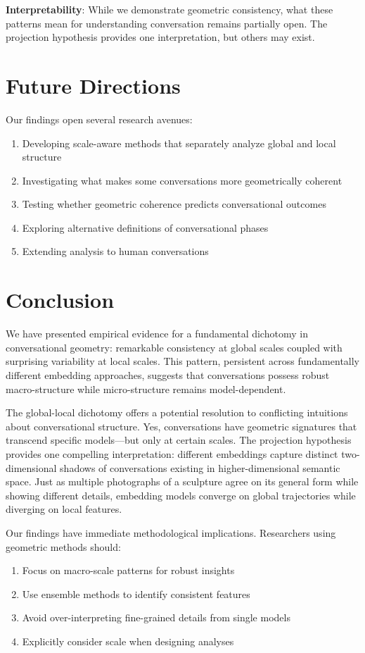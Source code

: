 \documentclass[11pt,letterpaper]{article}
\begin{document}
\textbf{Interpretability}: While we demonstrate geometric consistency, what these patterns mean for understanding conversation remains partially open. The projection hypothesis provides one interpretation, but others may exist.

\section{Future Directions}

Our findings open several research avenues:

\begin{enumerate}
\item Developing scale-aware methods that separately analyze global and local structure
\item Investigating what makes some conversations more geometrically coherent
\item Testing whether geometric coherence predicts conversational outcomes
\item Exploring alternative definitions of conversational phases
\item Extending analysis to human conversations
\end{enumerate}

\section{Conclusion}

We have presented empirical evidence for a fundamental dichotomy in conversational geometry: remarkable consistency at global scales coupled with surprising variability at local scales. This pattern, persistent across fundamentally different embedding approaches, suggests that conversations possess robust macro-structure while micro-structure remains model-dependent.

The global-local dichotomy offers a potential resolution to conflicting intuitions about conversational structure. Yes, conversations have geometric signatures that transcend specific models—but only at certain scales. The projection hypothesis provides one compelling interpretation: different embeddings capture distinct two-dimensional shadows of conversations existing in higher-dimensional semantic space. Just as multiple photographs of a sculpture agree on its general form while showing different details, embedding models converge on global trajectories while diverging on local features.

Our findings have immediate methodological implications. Researchers using geometric methods should:
\begin{enumerate}
\item Focus on macro-scale patterns for robust insights
\item Use ensemble methods to identify consistent features
\item Avoid over-interpreting fine-grained details from single models
\item Explicitly consider scale when designing analyses
\end{enumerate}
\end{document}

